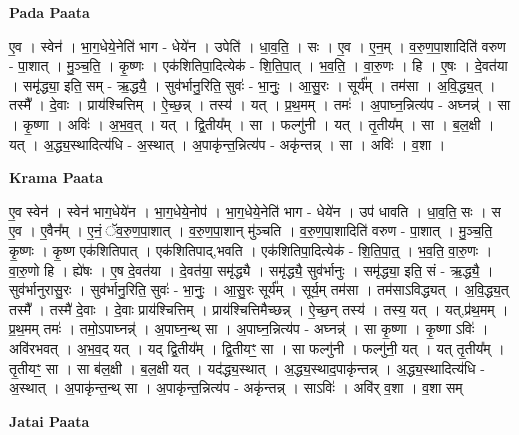 \documentclass[17pt]{extarticle}
\begin{document}
\textbf{Pada Paata} \newline

ए॒व । स्वेन॑ । भा॒ग॒धेये॒नेति॑ भाग - धेये॑न । उपेति॑ । धा॒व॒ति॒ । सः । ए॒व । ए॒न॒म् । व॒रु॒ण॒पा॒शादिति॑ वरुण - पा॒शात् । मु॒ञ्च॒ति॒ । कृ॒ष्णः । एक॑शितिपा॒दित्येक॑ - शि॒ति॒पा॒त् । भ॒व॒ति॒ । वा॒रु॒णः । हि । ए॒षः । दे॒वत॑या । समृ॑द्ध्या॒ इति॒ सम् - ऋ॒द्धयै॒ । सुव॑र्भानु॒रिति॒ सुवः॑ - भा॒नुः॒ । आ॒सु॒रः । सूर्य᳚म् । तम॑सा । अ॒वि॒द्ध्य॒त् । तस्मै᳚ । दे॒वाः । प्राय॑श्चित्तिम् । ऐ॒च्छ॒न्न् । तस्य॑ । यत् । प्र॒थ॒मम् । तमः॑ । अ॒पाघ्न॒न्नित्य॑प - अघ्नन्न्॑ । सा । कृ॒ष्णा । अविः॑ । अ॒भ॒व॒त् । यत् । द्वि॒तीय᳚म् । सा । फल्गु॑नी । यत् । तृ॒तीय᳚म् । सा । ब॒ल॒क्षी । यत् । अ॒द्ध्य॒स्थादित्य॑धि - अ॒स्थात् । अ॒पाकृ॑न्त॒न्नित्य॑प - अकृ॑न्तन्न् । सा । अविः॑ । व॒शा ।  \newline


\textbf{Krama Paata} \newline

ए॒व स्वेन॑ । स्वेन॑ भाग॒धेये॑न । भा॒ग॒धेये॒नोप॑ । भा॒ग॒धेये॒नेति॑ भाग - धेये॑न । उप॑ धावति । धा॒व॒ति॒ सः । स ए॒व । ए॒वैन᳚म् । ए॒नं॒ ॅव॒रु॒ण॒पा॒शात् । व॒रु॒ण॒पा॒शान् मु॑ञ्चति । व॒रु॒ण॒पा॒शादिति॑ वरुण - पा॒शात् । मु॒ञ्च॒ति॒ कृ॒ष्णः । कृ॒ष्ण एक॑शितिपात् । एक॑शितिपाद्,भवति । एक॑शितिपा॒दित्येक॑ - शि॒ति॒पा॒त्॒ । भ॒व॒ति॒ वा॒रु॒णः । वा॒रु॒णो हि । ह्ये॑षः । ए॒ष दे॒वत॑या । दे॒वत॑या॒ समृ॑द्ध्यै । समृ॑द्ध्यै॒ सुव॑र्भानुः । समृ॑द्ध्या॒ इति॒ सं - ऋ॒द्ध्यै॒ । सुव॑र्भानुरासु॒रः । सुव॑र्भानु॒रिति॒ सुवः॑ - भा॒नुः॒ । आ॒सु॒रः सूर्य᳚म् । सूर्य॒म् तम॑सा । तम॑साऽविद्ध्यत् । अ॒वि॒द्ध्य॒त् तस्मै᳚ । तस्मै॑ दे॒वाः । दे॒वाः प्राय॑श्चित्तिम् । प्राय॑श्चित्तिमैच्छन्न् । ऐ॒च्छ॒न् तस्य॑ । तस्य॒ यत् । यत्,प्र॑थ॒मम् । प्र॒थ॒मम् तमः॑ । तमो॒ऽपाघ्नन्न्॑ । अ॒पाघ्न॒न्थ् सा । अ॒पाघ्न॒न्नित्य॑प - अघ्नन्न्॑ । सा कृ॒ष्णा । कृ॒ष्णा ऽविः॑ । अवि॑रभवत् । अ॒भ॒व॒द् यत् । यद् द्वि॒तीय᳚म् । द्वि॒तीयꣳ॒॒ सा । सा फल्गु॑नी । फल्गु॑नी॒ यत् । यत् तृ॒तीय᳚म् । तृ॒तीयꣳ॒॒ सा । सा ब॑ल॒क्षी । ब॒ल॒क्षी यत् । यद॑द्ध्य॒स्थात् । अ॒द्ध्य॒स्थाद॒पाकृ॑न्तन्न् । अ॒द्ध्य॒स्थादित्य॑धि - अ॒स्थात् । अ॒पाकृ॑न्त॒न्थ् सा । अ॒पाकृ॑न्त॒न्नित्य॑प - अकृ॑न्तन्न् । साऽविः॑ । अवि॑र् व॒शा । व॒शा सम् \newline

\textbf{Jatai Paata} \newline
\end{document}
